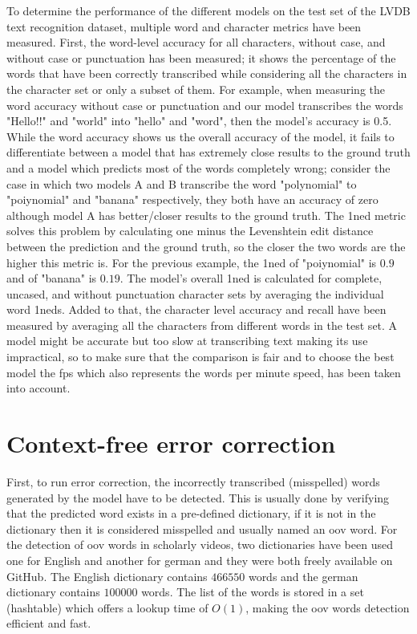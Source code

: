 To determine the performance of the different models on the test set of the LVDB text recognition dataset, multiple word and character metrics have been measured. First, the word-level accuracy for all characters, without case, and without case or punctuation has been measured; it shows the percentage of the words that have been correctly transcribed while considering all the characters in the character set or only a subset of them. For example, when measuring the word accuracy without case or punctuation and our model transcribes the words "Hello!!" and "world" into "hello" and "word", then the model's accuracy is 0.5. While the word accuracy shows us the overall accuracy of the model, it fails to differentiate between a model that has extremely close results to the ground truth and a model which predicts most of the words completely wrong; consider the case in which two models A and B transcribe the word "polynomial" to "poiynomial" and "banana" respectively, they both have an accuracy of zero although model A has better/closer results to the ground truth. The \gls{1ned} metric \cite{yujian_normalized_2007} solves this problem by calculating one minus the Levenshtein edit distance between the prediction and the ground truth, so the closer the two words are the higher this metric is. For the previous example, the \gls{1ned} of "poiynomial" is $0.9$ and of "banana" is $0.19$. The model's overall \gls{1ned} is calculated for complete, uncased, and without punctuation character sets by averaging the individual word \gls{1ned}s. Added to that, the character level accuracy and recall have been measured by averaging all the characters from different words in the test set. A model might be accurate but too slow at transcribing text making its use impractical, so to make sure that the comparison is fair and to choose the best model the \gls{fps} which also represents the words per minute speed, has been taken into account.

\section{Context-free error correction}

First, to run error correction, the incorrectly transcribed (misspelled) words generated by the model have to be detected. This is usually done by verifying that the predicted word exists in a pre-defined dictionary, if it is not in the dictionary then it is considered misspelled and usually named an \gls{oov} word.
For the detection of \gls{oov} words in scholarly videos, two dictionaries have been used one for English and another for german and they were both freely available on GitHub. The English dictionary contains $466550$ words and the german dictionary contains $100000$ words. The list of the words is stored in a set (hashtable) which offers a lookup time of $O(1)$, making the \gls{oov} words detection efficient and fast.

